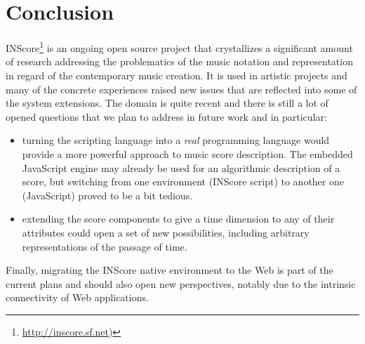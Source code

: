 \documentclass[11pt,a4paper]{article}
\begin{document}
\section{Conclusion}

INScore\footnote{\url{http://inscore.sf.net})} is an ongoing open source project 
that crystallizes a significant amount of research addressing the problematics of the music notation and representation in regard of the contemporary music creation. It is used in artistic projects and many of the concrete experiences raised new issues that are reflected into some of the system extensions. The domain is quite recent and there is still a lot of opened questions that we plan to address in future work and in particular: 
\begin{itemize}
\item turning the scripting language into a \emph{real} programming language would provide a more powerful approach to music score description. The embedded JavaScript engine may already be used for an algorithmic description of a score, but switching from one environment (INScore script) to another one (JavaScript) proved to be a bit tedious.
\item extending the score components to give a time dimension to any of their attributes could open a set of new possibilities, including arbitrary representations of the passage of time.
\end{itemize}
Finally, migrating the INScore native environment to the Web is part of the current plans and should also open new perspectives, notably due to the intrinsic connectivity of Web applications.


\balance


\end{document}
